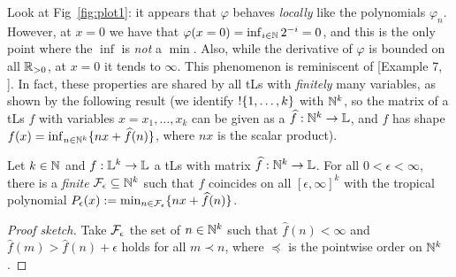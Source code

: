 \documentclass[submission,%
]{eptcs}
\begin{document}
Look at Fig~\ref{fig:plot1}: it appears that $\varphi$ behaves \emph{locally} like the polynomials $\varphi_{n}$. 
However, at
%
 $x=0$ we have that $\varphi(x=0)=\inf_{i\in\mathbb{N}} 2^{-i}=0$, and this is the only point where the $\inf$ is \emph{not} a $\min$.
Also, while the derivative of $\varphi$ is bounded on all $\mathbb{R}_{>0}$, at $x=0$ it tends to $\infty$.
This phenomenon is reminiscent of [Example 7, \cite{Ehrhard2005}].
In fact, these properties are shared by all tLs with \emph{finitely} many variables, as shown by the following result (we identify $!\{1,\dots,k\}$ with $\mathbb{N}^k$, so the matrix of a tLs $f$ with variables $x=x_1,\dots,x_k$ can be given as a $\widehat{f}:\mathbb{N}^k\to\mathbb{L}$, and $f$ has shape $f(x)=\inf_{n\in \mathbb{N}^k}\{nx+\widehat{f}(n)\}$, where $nx$ is the scalar product).

\begin{theorem}\label{theorem:fepsilon}
 Let $k\in\mathbb{N}$ and $f:\mathbb{L}^k\to\mathbb{L}$ a tLs with matrix $\widehat{f}:\mathbb{N}^k\to\mathbb{L}$.
 For all $0<\epsilon<\infty$, there is a \emph{finite} $\mathcal{F}_\epsilon \subseteq \mathbb{N}^k$ such that 
% 
$f$ coincides on all $[\epsilon,\infty]^k$ with the tropical {polynomial} $P_\epsilon(x):=\min_{n\in \mathcal{F}_\epsilon}\{nx+\widehat{f}(n)\}$.
\end{theorem}
\begin{proof}[Proof sketch]
Take $\mathcal{F}_\epsilon$ the set of $n\in\mathbb{N}^{k}$ such that 
$\widehat f(n)<\infty$ and $\widehat f(m)> \widehat f(n)+\epsilon$ holds for all $m\prec n$, where $\preceq$ is the pointwise order on $\mathbb{N}^k$.
\end{proof}
\end{document}
